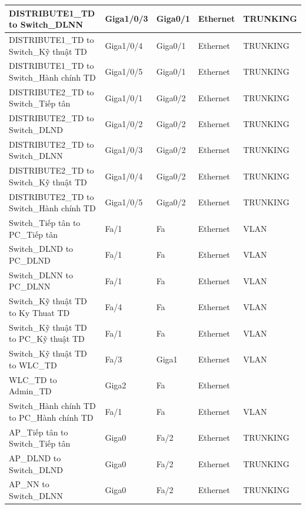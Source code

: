 \documentclass[a4paper, 12pt]{article}
\begin{document}
\begin{center}
\begin{longtable}{|p{}|p{}|p{}|p{}|p{}|}
\hline DISTRIBUTE1\_TD to Switch\_DLNN      &     Giga1/0/3     &     Giga0/1    &  Ethernet  &  TRUNKING  \\
\hline DISTRIBUTE1\_TD to Switch\_Kỹ thuật TD      &     Giga1/0/4     &     Giga0/1    &  Ethernet  &  TRUNKING  \\
\hline DISTRIBUTE1\_TD to Switch\_Hành chính TD      &     Giga1/0/5     &     Giga0/1    &  Ethernet  &  TRUNKING  \\
\hline DISTRIBUTE2\_TD to Switch\_Tiếp tân      &     Giga1/0/1     &     Giga0/2    &  Ethernet  &  TRUNKING  \\
\hline DISTRIBUTE2\_TD to Switch\_DLND      &     Giga1/0/2     &     Giga0/2    &  Ethernet  &  TRUNKING  \\
\hline DISTRIBUTE2\_TD to Switch\_DLNN      &     Giga1/0/3     &     Giga0/2    &  Ethernet  &  TRUNKING  \\
\hline DISTRIBUTE2\_TD to Switch\_Kỹ thuật TD      &     Giga1/0/4     &     Giga0/2    &  Ethernet  &  TRUNKING  \\
\hline DISTRIBUTE2\_TD to Switch\_Hành chính TD      &     Giga1/0/5     &     Giga0/2    &  Ethernet  &  TRUNKING  \\
\hline Switch\_Tiếp tân to PC\_Tiếp tân      &     Fa/1     &     Fa    &  Ethernet  &  VLAN  \\
\hline Switch\_DLND to PC\_DLND      &     Fa/1     &     Fa    &  Ethernet  &  VLAN  \\
\hline Switch\_DLNN to PC\_DLNN      &     Fa/1     &     Fa    &  Ethernet  &  VLAN  \\
\hline Switch\_Kỹ thuật TD to Ky Thuat TD      &     Fa/4     &     Fa    &  Ethernet  &  VLAN  \\
\hline Switch\_Kỹ thuật TD to PC\_Kỹ thuật TD      &     Fa/1     &     Fa    &  Ethernet  &  VLAN  \\
\hline Switch\_Kỹ thuật TD to WLC\_TD      &     Fa/3     &     Giga1    &  Ethernet  &  VLAN  \\
\hline WLC\_TD to Admin\_TD      &     Giga2     &     Fa    &  Ethernet  &   \\
\hline Switch\_Hành chính TD to PC\_Hành chính TD      &     Fa/1     &     Fa    &  Ethernet  &  VLAN  \\
\hline AP\_Tiếp tân to Switch\_Tiếp tân      &     Giga0     &     Fa/2    &  Ethernet  &  TRUNKING  \\
\hline AP\_DLND to Switch\_DLND      &     Giga0     &     Fa/2    &  Ethernet  &  TRUNKING  \\
\hline AP\_NN to Switch\_DLNN      &     Giga0     &     Fa/2    &  Ethernet  &  TRUNKING  \\

\end{longtable}
\end{center}
\end{document}
